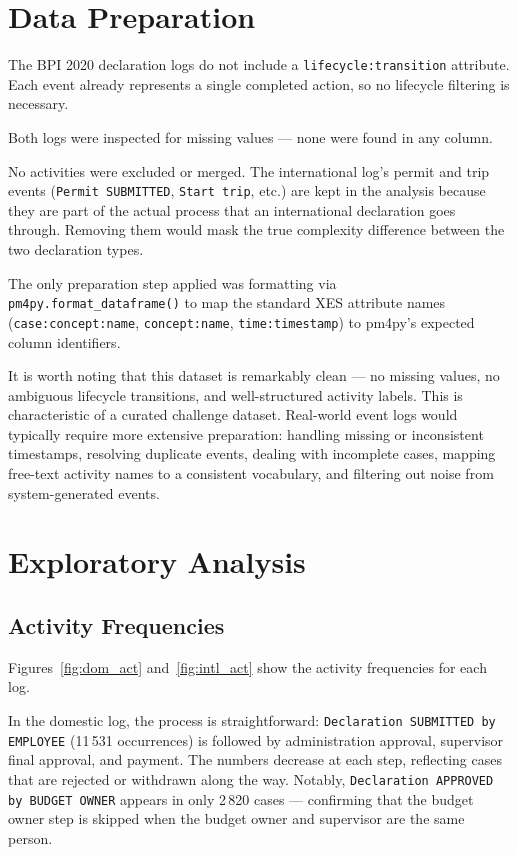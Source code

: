 \documentclass[11pt,a4paper]{article}
\begin{document}
\section{Data Preparation}

The BPI 2020 declaration logs do not include a \texttt{lifecycle:transition} attribute. Each event already represents a single completed action, so no lifecycle filtering is necessary.

Both logs were inspected for missing values — none were found in any column.

No activities were excluded or merged. The international log's permit and trip events (\texttt{Permit SUBMITTED}, \texttt{Start trip}, etc.) are kept in the analysis because they are part of the actual process that an international declaration goes through. Removing them would mask the true complexity difference between the two declaration types.

The only preparation step applied was formatting via \texttt{pm4py.format\_dataframe()} to map the standard XES attribute names (\texttt{case:concept:name}, \texttt{concept:name}, \texttt{time:timestamp}) to pm4py's expected column identifiers.

It is worth noting that this dataset is remarkably clean — no missing values, no ambiguous lifecycle transitions, and well-structured activity labels. This is characteristic of a curated challenge dataset. Real-world event logs would typically require more extensive preparation: handling missing or inconsistent timestamps, resolving duplicate events, dealing with incomplete cases, mapping free-text activity names to a consistent vocabulary, and filtering out noise from system-generated events.

\section{Exploratory Analysis}

\subsection{Activity Frequencies}

Figures~\ref{fig:dom_act} and~\ref{fig:intl_act} show the activity frequencies for each log.

In the domestic log, the process is straightforward: \texttt{Declaration SUBMITTED by EMPLOYEE} (11\,531 occurrences) is followed by administration approval, supervisor final approval, and payment. The numbers decrease at each step, reflecting cases that are rejected or withdrawn along the way. Notably, \texttt{Declaration APPROVED by BUDGET OWNER} appears in only 2\,820 cases — confirming that the budget owner step is skipped when the budget owner and supervisor are the same person.
\end{document}
